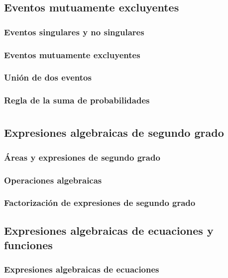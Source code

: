 \documentclass[11pt]{book}
\begin{document}
\newpage \thispagestyle{plain}
\section{Eventos mutuamente excluyentes}
\subsection{Eventos singulares y no singulares}
\subsection{Eventos mutuamente excluyentes}
\subsection{Unión de dos eventos}
\subsection{Regla de la suma de probabilidades}

\chapter{}

\newpage \thispagestyle{plain}
\section{Expresiones algebraicas de segundo grado}
\subsection{Áreas y expresiones de segundo grado}
\subsection{Operaciones algebraicas}
\subsection{Factorización de expresiones de segundo grado}

\newpage \thispagestyle{plain}
\section{Expresiones algebraicas de ecuaciones y funciones}
\subsection{Expresiones algebraicas de ecuaciones}
\end{document}

